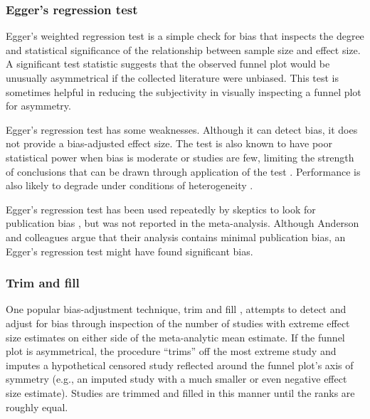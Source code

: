 \documentclass[man, mask]{apa6}
\begin{document}
\subsubsection{Egger's regression test}
Egger's weighted regression test \citep{Sterne:Egger:2005} is a simple check for bias that inspects the degree and statistical significance of the relationship between sample size and effect size. A significant test statistic suggests that the observed funnel plot would be unusually asymmetrical if the collected literature were unbiased. This test is sometimes helpful in reducing the subjectivity in visually inspecting a funnel plot for asymmetry. 

Egger's regression test has some weaknesses. Although it can detect bias, it does not provide a bias-adjusted effect size. The test is also known to have poor statistical power when bias is moderate or studies are few, limiting the strength of conclusions that can be drawn through application of the test \citep{Sterne:etal:2000}. Performance is also likely to degrade under conditions of heterogeneity \citep[e.g.,][]{Terrin:etal:2003}. %

Egger's regression test has been used repeatedly by skeptics to look for publication bias \citep[e.g.,][]{Ferguson:2007,Ferguson:Kilburn:2009}, but was not reported in the \citet{Anderson:etal:2010} meta-analysis. Although Anderson and colleagues argue that their analysis contains minimal publication bias, an Egger's regression test might have found significant bias.

\subsubsection{Trim and fill}
One popular bias-adjustment technique, trim and fill \citep{Duval:Tweedie:2000}, attempts to detect and adjust for bias through inspection of the number of studies with extreme effect size estimates on either side of the meta-analytic mean estimate. If the funnel plot is asymmetrical, the procedure ``trims'' off the most extreme study and imputes a hypothetical censored study reflected around the funnel plot's axis of symmetry (e.g., an imputed study with a much smaller or even negative effect size estimate). Studies are trimmed and filled in this manner until the ranks are roughly equal. 
\end{document}
